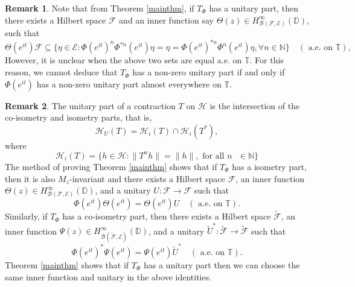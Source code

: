 \documentclass[12pt]{amsart}
\numberwithin{equation}{section}
\theoremstyle{definition}
\newtheorem{rem}{Remark}[section]
\newcommand{\Nat}{\mathbb{N}}
\newcommand{\D}{\mathbb{D}}
\newcommand{\T}{\mathbb{T}}
\newcommand{\1}{{\mbox{\bf 1}}}
\newcommand{\clb}{\mathcal{B}}
\newcommand{\cle}{\mathcal{E}}
\newcommand{\clf}{\mathcal{F}}
\newcommand{\clh}{\mathcal{H}}
\newcommand{\raro}{\rightarrow}
\begin{document}
\begin{rem}
Note that from Theorem \ref{mainthm}, if $T_{\Phi}$ has a unitary part, then there exists a Hilbert space $\clf$ and an inner function say $\Theta(z) \in H_{\clb(\clf,\cle)}^{\infty}(\D)$, such that
\[
\Theta(e^{it}) \clf \subseteq \{\eta \in \cle: \Phi(e^{it})^n \Phi^{*n}(e^{it}) \eta = \eta = \Phi(e^{it})^{*n} \Phi^{n}(e^{it}) \eta, \forall n \in \Nat\} \quad (\text{ a.e. on }\T),
\]
However, it is unclear when the above two sets are equal a.e. on $\T$.  For this reason, we cannot deduce that $T_{\Phi}$ has a non-zero unitary part if and only if $\Phi(e^{it})$ has a non-zero unitary part almost everywhere on $\T$. 
\end{rem}

\begin{rem}
The unitary part of a contraction $T$ on $\clh$ is the intersection of the co-isometry and isometry parts, that is,
\[
\clh_U(T) = \clh_i(T) \cap \clh_{i}(T^*),
\] 
where
\[
\clh_i(T) = \{h \in \clh: \|T^n h\| = \|h\|, \text{ for all $n$ } \in \Nat\}
\]
The method of proving Theorem \ref{mainthm} shows that if $T_{\Phi}$ has a isometry part, then it is also $M_z$-invariant and there exists a Hilbert space $\clf$, an inner function $\Theta(z) \in H_{\clb(\clf,\cle)}^{\infty}(\D)$, and a unitary $U:\clf \raro \clf$ such that
\[
\Phi(e^{it}) \Theta(e^{it}) = \Theta(e^{it}) U \quad (\text{ a.e. on } \mathbb{T}).
\]
Similarly, if $T_{\Phi}$ has a co-isometry part, then there exists a Hilbert space $\tilde{\clf}$, an inner function $\Psi(z)  \in H_{\clb(\tilde{\clf},\cle)}^{\infty}(\D)$, and a unitary $\tilde{U}^*:\tilde{\clf} \raro \tilde{\clf}$ such that 
\[
\Phi(e^{it})^* \Psi(e^{it}) = \Psi(e^{it}) \tilde{U}^* \quad (\text{ a.e. on } \mathbb{T}).
\]
Theorem \ref{mainthm} shows that if $T_{\Phi}$ has a unitary part then we can choose the same inner function and unitary in the above identities.
\end{rem}
\end{document}
